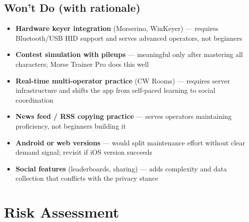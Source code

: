 \documentclass[11pt,letterpaper]{article}
\begin{document}
\subsection*{Won't Do (with rationale)}

\begin{itemize}[nosep]
  \item \textbf{Hardware keyer integration} (Morserino, WinKeyer) --- requires Bluetooth/USB HID support and serves advanced operators, not beginners
  \item \textbf{Contest simulation with pileups} --- meaningful only after mastering all characters; Morse Trainer Pro does this well
  \item \textbf{Real-time multi-operator practice} (CW Rooms) --- requires server infrastructure and shifts the app from self-paced learning to social coordination
  \item \textbf{News feed / RSS copying practice} --- serves operators maintaining proficiency, not beginners building it
  \item \textbf{Android or web versions} --- would split maintenance effort without clear demand signal; revisit if iOS version succeeds
  \item \textbf{Social features} (leaderboards, sharing) --- adds complexity and data collection that conflicts with the privacy stance
\end{itemize}


\clearpage
\section*{Risk Assessment}
\end{document}
